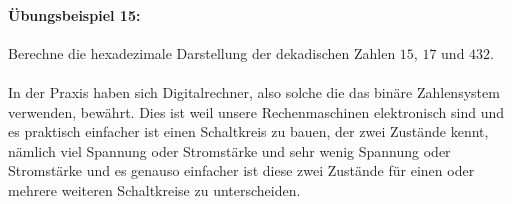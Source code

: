 \documentclass[11pt,a4paper,leqno]{report}
\numberwithin{equation}{chapter}
\begin{document}
\paragraph{\"Ubungsbeispiel 15:} Berechne die hexadezimale Darstellung der dekadischen Zahlen $15$, $17$ und $432$.\\
\\
In der Praxis haben sich Digitalrechner, also solche die das bin\"are Zahlensystem verwenden, bew\"ahrt. Dies ist weil unsere Rechenmaschinen elektronisch sind und es praktisch einfacher ist einen Schaltkreis zu bauen, der zwei Zust\"ande kennt, n\"amlich viel Spannung oder Stromst\"arke und sehr wenig Spannung oder Stromst\"arke und es genauso einfacher ist diese zwei Zust\"ande f\"ur einen oder mehrere weiteren Schaltkreise zu unterscheiden.


\newpage
\end{document}
